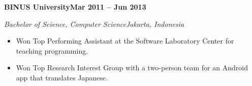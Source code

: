 \documentclass[11pt,letterpaper]{article}
\newcommand{\school}[2]{%
  \Needspace{5\baselineskip}
  \vspace{8pt}
  {\headfont\bfseries\color{heading}#1\hfill#2\par}
}
\newcommand{\degree}[2]{%
  \vspace{2pt}
  {\itshape\color{muted}#1\hfill #2\par}
}
\begin{document}
\school{BINUS University}{Mar 2011 -- Jun 2013}
\degree{Bachelor of Science, Computer Science}{Jakarta, Indonesia}
\begin{itemize}
  \item Won Top Performing Assistant at the Software Laboratory Center for teaching programming.
  \item Won Top Research Interest Group with a two-person team for an Android app that translates Japanese.
\end{itemize}
\end{document}

